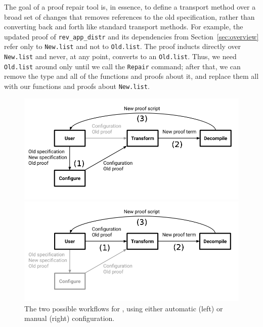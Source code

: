 The goal of a proof repair tool is, in essence, to
define a transport method over a broad set of changes that
removes references to the old specification, rather than converting back and forth
like standard transport methods.
For example, the updated proof of \lstinline{rev_app_distr} and its dependencies
from Section~\ref{sec:overview} refer only to \lstinline{New.list} and not to \lstinline{Old.list}.
The proof inducts directly over \lstinline{New.list} and never, at any point, converts to an \lstinline{Old.list}.
Thus, we need \lstinline{Old.list} around only until we call the \lstinline{Repair} command;
after that, we can remove the type and all of the functions and proofs about it, and replace them all with
our functions and proofs about \lstinline{New.list}.

\begin{figure}
\begin{minipage}{0.49\textwidth}
\includegraphics[width=\linewidth]{workflowa.png}
\end{minipage}
\hfill
\begin{minipage}{0.49\textwidth}
\includegraphics[width=\linewidth]{workflowb.png}
\end{minipage}
\caption{The two possible workflows for \toolname, using either automatic (left) or manual (right) configuration.}
\label{fig:system}
\end{figure}

